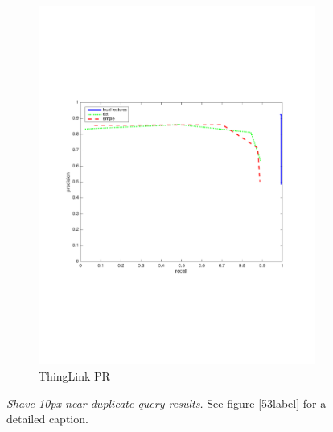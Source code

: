 \documentclass[english,12pt,a4paper,pdftex,elec,utf8, table]{aaltothesis}
\begin{document}
\begin{figure}[htb]
\begin{center}
\begin{subfigure}[b]{0.49\textwidth}
    \includegraphics[width=\textwidth]{figures/thinglink_Shave10pxPR.pdf}
    \caption{ThingLink PR}
    \label{Shaveprthinglink}
  \end{subfigure}
  \caption{\emph{Shave 10px near-duplicate query results.} See figure \ref{53label} for a detailed caption.\label{shavelabel}}
  \end{center}
\end{figure}
\end{document}
